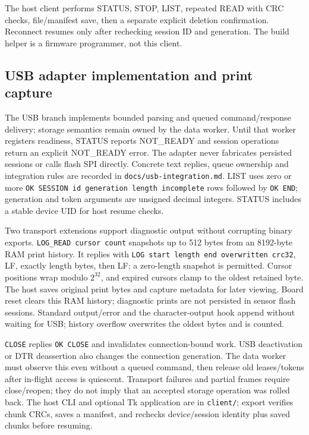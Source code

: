 The host client performs STATUS, STOP, LIST, repeated READ with CRC checks, file/manifest save, then a separate explicit deletion confirmation. Reconnect resumes only after rechecking session ID and generation. The build helper is a firmware programmer, not this client.

\subsection{USB adapter implementation and print capture}
The USB branch implements bounded parsing and queued command/response delivery; storage semantics remain owned by the data worker. Until that worker registers readiness, STATUS reports NOT\_READY and session operations return an explicit NOT\_READY error. The adapter never fabricates persisted sessions or calls flash SPI directly. Concrete text replies, queue ownership and integration rules are recorded in \texttt{docs/usb-integration.md}. LIST uses zero or more \texttt{OK SESSION id generation length incomplete} rows followed by \texttt{OK END}; generation and token arguments are unsigned decimal integers. STATUS includes a stable device UID for host resume checks.

Two transport extensions support diagnostic output without corrupting binary exports. \texttt{LOG\_READ cursor count} snapshots up to 512 bytes from an 8192-byte RAM print history. It replies with \texttt{LOG start length end overwritten crc32}, LF, exactly length bytes, then LF; a zero-length snapshot is permitted. Cursor positions wrap modulo \(2^{32}\), and expired cursors clamp to the oldest retained byte. The host saves original print bytes and capture metadata for later viewing. Board reset clears this RAM history; diagnostic prints are not persisted in sensor flash sessions. Standard output/error and the character-output hook append without waiting for USB; history overflow overwrites the oldest bytes and is counted.

\texttt{CLOSE} replies \texttt{OK CLOSE} and invalidates connection-bound work. USB deactivation or DTR deassertion also changes the connection generation. The data worker must observe this even without a queued command, then release old leases/tokens after in-flight access is quiescent. Transport failures and partial frames require close/reopen; they do not imply that an accepted storage operation was rolled back. The host CLI and optional Tk application are in \texttt{client/}; export verifies chunk CRCs, saves a manifest, and rechecks device/session identity plus saved chunks before resuming.
